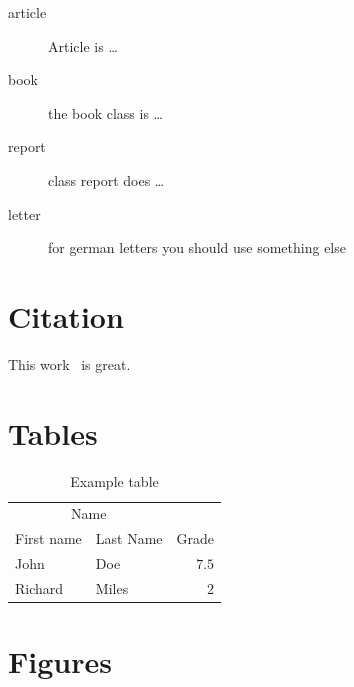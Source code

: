 \begin{description}
	\item[article\label{article}]{Article is \ldots}
	\item[book\label{book}]{the book class is \ldots}
	\item[report\label{report}]{class report does \ldots}
	\item[letter\label{letter}]{for german letters you should use something else}
\end{description}
	



\section{Citation}\label{sec:cite}

This work~\cite{doe2006test} is great.

\section{Tables}\label{sec:tab}

\begin{table}[H]
	\caption{Example table}
	\centering
	\begin{tabular}{llr}
		\toprule
		\multicolumn{2}{c}{Name} \\
		\cmidrule(r){1-2}
		First name & Last Name & Grade \\
		\midrule
		John & Doe & $7.5$ \\
		Richard & Miles & $2$ \\
		\bottomrule
	\end{tabular}
\end{table}

\lipsum[5] %


\section{Figures}\label{sec:fig}

